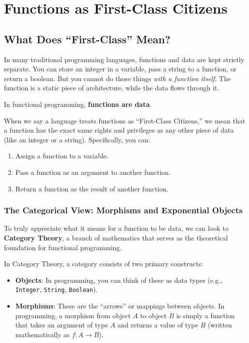 \chapter{Functions as First-Class Citizens}

\section{What Does ``First-Class'' Mean?}

In many traditional programming languages, functions and data are kept strictly separate. You can store an integer in a variable, pass a string to a function, or return a boolean. But you cannot do those things \textit{with a function itself}. The function is a static piece of architecture, while the data flows through it.

In functional programming, \textbf{functions are data}. 

When we say a language treats functions as ``First-Class Citizens,'' we mean that a function has the exact same rights and privileges as any other piece of data (like an integer or a string). Specifically, you can:
\begin{enumerate}
    \item Assign a function to a variable.
    \item Pass a function as an argument to another function.
    \item Return a function as the result of another function.
\end{enumerate}

\subsection{The Categorical View: Morphisms and Exponential Objects}

To truly appreciate what it means for a function to be data, we can look to \textbf{Category Theory}, a branch of mathematics that serves as the theoretical foundation for functional programming. 

In Category Theory, a category consists of two primary constructs:
\begin{itemize}
    \item \textbf{Objects}: In programming, you can think of these as data types (e.g., \texttt{Integer}, \texttt{String}, \texttt{Boolean}).
    \item \textbf{Morphisms}: These are the ``arrows'' or mappings between objects. In programming, a morphism from object $A$ to object $B$ is simply a function that takes an argument of type $A$ and returns a value of type $B$ (written mathematically as $f: A \to B$).
\end{itemize}


